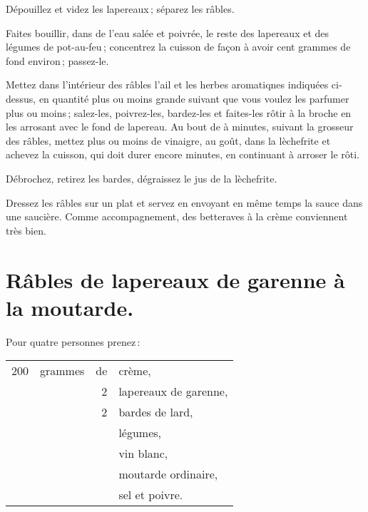 Dépouillez et videz les lapereaux ; séparez les râbles.

Faites bouillir, dans de l'eau salée et poivrée, le reste des lapereaux et des
légumes de pot-au-feu ; concentrez la cuisson de façon à avoir cent grammes de
fond environ ; passez-le.

Mettez dans l'intérieur des râbles l'ail et les herbes aromatiqnes indiquées
ci-dessus, en quantité plus ou moins grande suivant que vous voulez les
parfumer plus ou moins ; salez-les, poivrez-les, bardez-les et faites-les rôtir
à la broche en les arrosant avec le fond de lapereau. Au bout de {\mmm}
à {\mmm} minutes, suivant la grosseur des râbles, mettez plus ou moins de
vinaigre, au goût, dans la lèchefrite et achevez la cuisson, qui doit durer
encore {\mmm} minutes, en continuant à arroser le rôti.

Débrochez, retirez les bardes, dégraissez le jus de la lèchefrite.

Dressez les râbles sur un plat et servez en envoyant en même temps la sauce
dans une saucière. Comme accompagnement, des betteraves à la crème conviennent
très bien.

\section*{\centering Râbles de lapereaux de garenne à la moutarde.}
{}

Pour quatre personnes prenez :

\footnotesize
\begin{longtable}{rrrp{16em}}
    200 & grammes & de & crème,                                                                           \\
        &         &  2 & lapereaux de garenne,                                                            \\
        &         &  2 & bardes de lard,                                                                  \\
        &         &    & légumes,                                                                         \\
        &         &    & vin blanc,                                                                       \\
        &         &    & moutarde ordinaire,                                                              \\
        &         &    & sel et poivre.                                                                   \\
\end{longtable}
\normalsize

